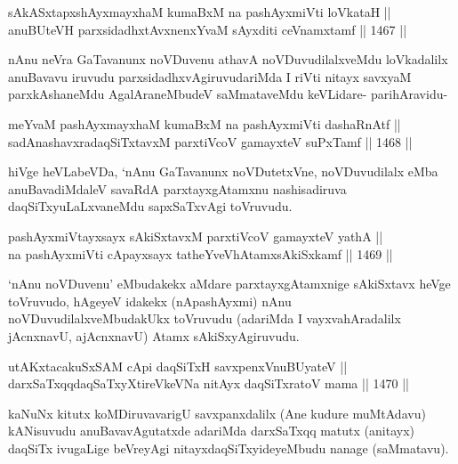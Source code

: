 
\begin{shl}
sAkASxtapxshAyxmayxhaM kumaBxM na pashAyxmiVti loVkataH || \\
anuBUteVH parxsidadhxtAvxnenxYvaM sAyxditi ceVnamxtamf ||  1467 ||  
\end{shl}

\begin{artha}
nAnu neVra GaTavanunx noVDuvenu athavA noVDuvudilalxveMdu loVkadalilx anuBavavu iruvudu parxsidadhxvAgiruvudariMda I riVti nitayx savxyaM parxkAshaneMdu AgalAraneMbudeV saMmataveMdu keVLidare- parihAravidu-
\end{artha}

\begin{shl}
meYvaM pashAyxmayxhaM kumaBxM na pashAyxmiVti dashaRnAtf || \\
sadA\s nashavxradaqSiTxtavxM parxtiVcoV gamayxteV suPxTamf ||  1468 ||  
\end{shl}

\begin{artha}
hiVge heVLabeVDa, `nAnu GaTavanunx noVDutetxVne, noVDuvudilalx eMba anuBavadiMdaleV savaRdA parxtayxgAtamxnu nashisadiruva daqSiTxyuLaLxvaneMdu sapxSaTxvAgi toVruvudu.
\end{artha}


\begin{shl}
pashAyxmiVtayxsayx sAkiSxtavxM parxtiVcoV gamayxteV yathA || \\
na pashAyxmiVti cApayxsayx tatheYveVhA\s \s tamxsAkiSxkamf ||  1469 ||  
\end{shl}

\begin{artha}
`nAnu noVDuvenu' eMbudakekx aMdare parxtayxgAtamxnige sAkiSxtavx heVge toVruvudo, hAgeyeV idakekx (nApashAyxmi) nAnu noVDuvudilalxveMbudakUkx toVruvudu (adariMda I vayxvahAradalilx jAcnxnavU, ajAcnxnavU) Atamx sAkiSxyAgiruvudu.
\end{artha}

\begin{shl}
utAKxtacakuSxSAM cApi daqSiTxH savxpenxV\s nuBUyateV || \\
darxSaTxqqdaqSaTxyXtireVkeVNa nitAyx daqSiTxratoV mama ||  1470 ||  
\end{shl}

\begin{artha}
kaNuNx kitutx koMDiruvavarigU savxpanxdalilx (Ane kudure muMtAdavu) kANisuvudu anuBavavAgutatxde adariMda darxSaTxqq matutx (anitayx) daqSiTx ivugaLige beVreyAgi nitayxdaqSiTxyideyeMbudu nanage (saMmatavu).
\end{artha}

